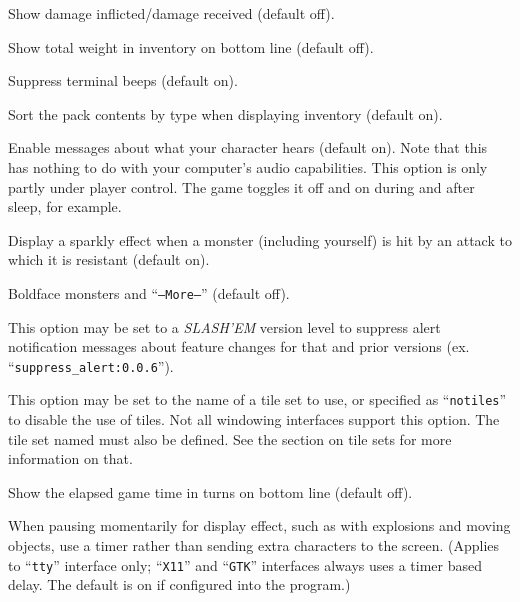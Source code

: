 \item[\ib{showdmg}]
Show damage inflicted/damage received (default off).

\item[\ib{showweight}]
Show total weight in inventory on bottom line (default off).

\item[\ib{silent}]
Suppress terminal beeps (default on).

\item[\ib{sortpack}]
Sort the pack contents by type when displaying inventory (default on).

\item[\ib{sound}]
Enable messages about what your character hears (default on).
Note that this has nothing to do with your computer's audio capabilities.
This option is only partly under player control.  The game toggles it
off and on during and after sleep, for example.

\item[\ib{sparkle}]
Display a sparkly effect when a monster (including yourself) is hit by an
attack to which it is resistant (default on).

\item[\ib{standout}]
Boldface monsters and ``{\tt --More--}'' (default off).

\item[\ib{suppress\_alert}]
This option may be set to a {\it SLASH'EM\/} version level to suppress
alert notification messages about feature changes for that 
and prior versions (ex. ``{\tt suppress\_alert:0.0.6}'').

\item[\ib{tiles}]
This option may be set to the name of a tile set to use, or specified
as ``{\tt notiles}'' to disable the use of tiles. Not all windowing interfaces
support this option. The tile set named must also be defined. See the
section on tile sets for more information on that.

\item[\ib{time}]
Show the elapsed game time in turns on bottom line (default off).

\item[\ib{timed\_delay}]
When pausing momentarily for display effect, such as with explosions and
moving objects, use a timer rather than sending extra characters to the
screen.  (Applies to ``{\tt tty}'' interface only; ``{\tt X11}'' and ``{\tt GTK}'' interfaces always
uses a timer based delay.  The default is on if configured into the
program.)

